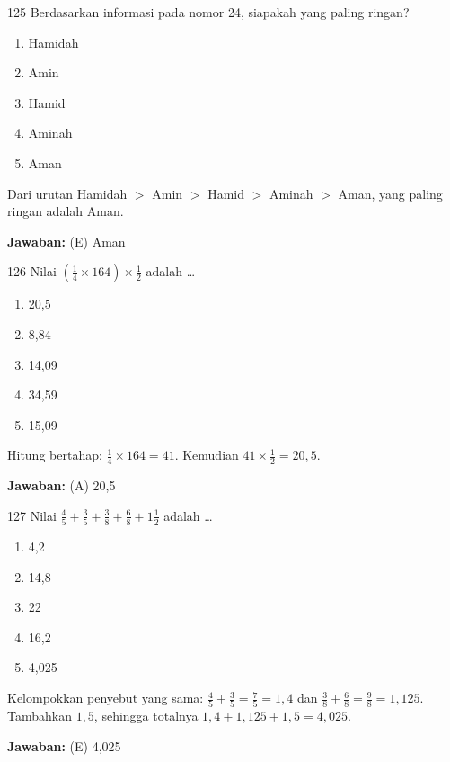 \documentclass[11pt]{article}
\newenvironment{pil}{\begin{enumerate}[label=(\Alph*),leftmargin=*,itemsep=1pt,topsep=3pt]}{\end{enumerate}}
\newcommand{\jw}[1]{\par\smallskip\begin{jawbox}\textbf{Jawaban:} #1\end{jawbox}}
\begin{document}
\begin{soalbox}{1}{25}
Berdasarkan informasi pada nomor 24, siapakah yang paling ringan?
\begin{pil}\item Hamidah \item Amin \item Hamid \item Aminah \item Aman\end{pil}
\end{soalbox}
\begin{pembox}
Dari urutan Hamidah $>$ Amin $>$ Hamid $>$ Aminah $>$ Aman, yang paling ringan adalah Aman.
\jw{(E) Aman}
\end{pembox}

\begin{soalbox}{1}{26}
Nilai $\left(\frac{1}{4}\times164\right)\times\frac{1}{2}$ adalah \ldots
\begin{pil}\item 20,5 \item 8,84 \item 14,09 \item 34,59 \item 15,09\end{pil}
\end{soalbox}
\begin{pembox}
Hitung bertahap: $\frac{1}{4}\times164=41$. Kemudian $41\times\frac{1}{2}=20{,}5$.
\jw{(A) 20,5}
\end{pembox}

\begin{soalbox}{1}{27}
Nilai $\frac{4}{5}+\frac{3}{5}+\frac{3}{8}+\frac{6}{8}+1\frac{1}{2}$ adalah \ldots
\begin{pil}\item 4,2 \item 14,8 \item 22 \item 16,2 \item 4,025\end{pil}
\end{soalbox}
\begin{pembox}
Kelompokkan penyebut yang sama: $\frac{4}{5}+\frac{3}{5}=\frac{7}{5}=1{,}4$ dan $\frac{3}{8}+\frac{6}{8}=\frac{9}{8}=1{,}125$. Tambahkan $1{,}5$, sehingga totalnya $1{,}4+1{,}125+1{,}5=4{,}025$.
\jw{(E) 4,025}
\end{pembox}
\end{document}
